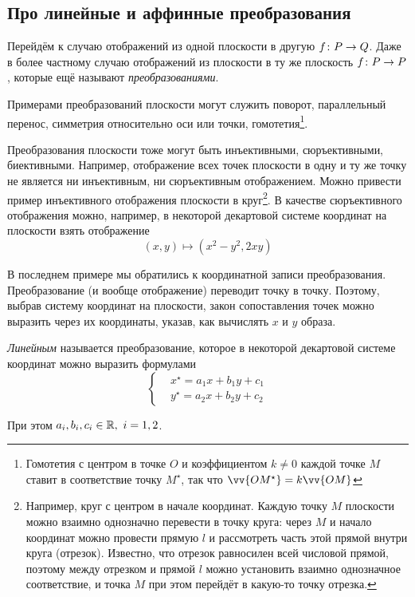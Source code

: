 \documentclass[a4paper,12pt]{article}
\begin{document}
  
  \subsection{Про линейные и аффинные преобразования}
  
  Перейдём к случаю отображений из одной плоскости в другую $f\colon P \hm\to Q$.
  Даже в более частному случаю отображений из плоскости в ту же плоскость $f\colon P \hm\to P$, которые ещё называют \emph{преобразованиями}.
  
  Примерами преобразований плоскости могут служить поворот, параллельный перенос, симметрия относительно оси или точки, гомотетия\footnote{Гомотетия с центром в точке $O$ и коэффициентом $k \not=0 $ каждой точке $M$ ставит в соответствие точку $M^\star$, так что $\vv{OM^\star} \hm= k\vv{OM}$}.
  
  Преобразования плоскости тоже могут быть инъективными, сюръективными, биективными.
  Например, отображение всех точек плоскости в одну и ту же точку не является ни инъективным, ни сюръективным отображением.
  Можно привести пример инъективного отображения плоскости в круг\footnote{
    Например, круг с центром в начале координат.
    Каждую точку $M$ плоскости можно взаимно однозначно перевести в точку круга: через $M$ и начало координат можно провести прямую $l$ и рассмотреть часть этой прямой внутри круга (отрезок).
    Известно, что отрезок равносилен всей числовой прямой, поэтому между отрезком и прямой $l$ можно установить взаимно однозначное соответствие, и точка $M$ при этом перейдёт в какую-то точку отрезка.
  }.
  В качестве сюръективного отображения можно, например, в некоторой декартовой системе координат на плоскости взять отображение
  \[
    (x, y) \mapsto \left(x^2 - y^2, 2xy\right)
  \]
  
  В последнем примере мы обратились к координатной записи преобразования.
  Преобразование (и вообще отображение) переводит точку в точку.
  Поэтому, выбрав систему координат на плоскости, закон сопоставления точек можно выразить через их координаты, указав, как вычислять $x$ и $y$ образа.
  
  \begin{definition}
    \emph{Линейным} называется преобразование, которое в некоторой декартовой системе координат можно выразить формулами
    \begin{equation}
      \label{eq:linear}
      \left\{
        \begin{aligned}
          &x^\star = a_1 x + b_1 y + c_1\\
          &y^\star = a_2 x + b_2 y + c_2
        \end{aligned}
      \right.
    \end{equation}
    
    При этом $a_i, b_i, c_i \hm\in \RR,\ i = 1, 2$.
  \end{definition}
  
\end{document}
